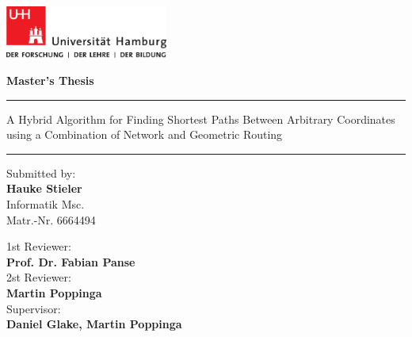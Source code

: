 
\pagenumbering{}

\begin{titlepage}
	
	\includegraphics[width=0.4\textwidth]{images/UHH-Logo_2010_Farbe_CMYK.pdf}
	\vspace{1cm}
	
	\begin{center}
		
		{
			\Large
			\textbf{Master's Thesis}
			\par
		}
		
		\vspace{1.5cm}
		\hrule
		\vspace{1cm}
		
		{
			\titlefont
			\huge
			A Hybrid Algorithm for Finding Shortest Paths Between Arbitrary Coordinates using a Combination of Network and Geometric Routing
			\par
		}
		
		\vspace{1cm}
		\hrule
		\vspace{1.5cm}
	\end{center}
	
	\begin{multicols}{2}
		\raggedright
		Submitted by:\\
		\textbf{Hauke Stieler}\\Informatik Msc.\\Matr.-Nr. 6664494
		
		\columnbreak
		\raggedleft
		
		1st Reviewer:\\
		\textbf{Prof. Dr. Fabian Panse}\\
		\vspace{0.25cm}
		2st Reviewer:\\
		\textbf{Martin Poppinga}\\
		\vspace{0.25cm}
		Supervisor:\\
		\textbf{Daniel Glake, Martin Poppinga}
	\end{multicols}


\end{titlepage}
